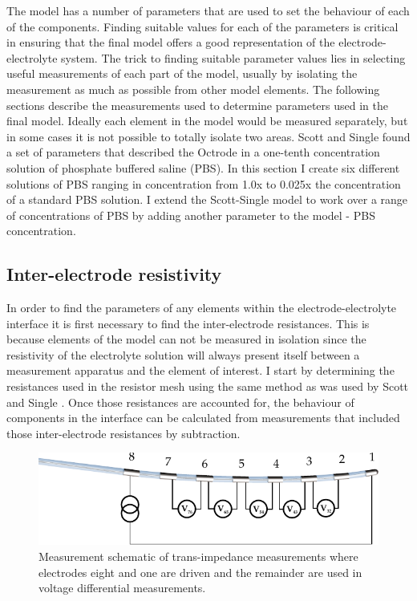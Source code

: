   The model has a number of parameters that are used to set the behaviour of each of the components.
  Finding suitable values for each of the parameters is critical in ensuring that the final model offers a good representation of the electrode-electrolyte system.
  The trick to finding suitable parameter values lies in selecting useful measurements of each part of the model, usually by isolating the measurement as much as possible from other model elements.
  The following sections describe the measurements used to determine parameters used in the final model.
  Ideally each element in the model would be measured separately, but in some cases it is not possible to totally isolate two areas.
  Scott and Single found a set of parameters that described the Octrode in a one-tenth concentration solution of phosphate buffered saline (PBS).
  In this section I create six different solutions of PBS ranging in concentration from 1.0x to 0.025x the concentration of a standard PBS solution.
  I extend the Scott-Single model to work over a range of concentrations of PBS by adding another parameter to the model - PBS concentration.


  \subsection{Inter-electrode resistivity}


    In order to find the parameters of any elements within the electrode-electrolyte interface it is first necessary to find the inter-electrode resistances.
    This is because elements of the model can not be measured in isolation since the resistivity of the electrolyte solution will always present itself between a measurement apparatus and the element of interest.
    I start by determining the resistances used in the resistor mesh using the same method as was used by Scott and Single \cite{Scott2014}.
    Once those resistances are accounted for, the behaviour of components in the interface can be calculated from measurements that included those inter-electrode resistances by subtraction.

    \begin{figure}
      \centering
      \includegraphics{content/pt2/07-InterfaceModel/graphics/TransimpedanceMeasurements_Stim81}
      \caption{\label{fig:pt2-transimpedanceMeasurementDiagram_81Stim}Measurement schematic of trans-impedance measurements where electrodes eight and one are driven and the remainder are used in voltage differential measurements.}
    \end{figure}

